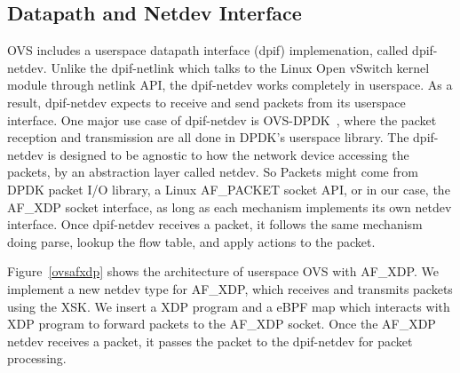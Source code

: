 \documentclass[10pt]{sigplanconf}
\begin{document}
\subsection{Datapath and Netdev Interface}
OVS includes a userspace datapath interface (dpif) implemenation, called dpif-netdev.
Unlike the dpif-netlink which talks to the Linux Open vSwitch kernel
module through netlink API, the dpif-netdev works completely in userspace.
As a result, dpif-netdev expects to receive and send packets from its userspace
interface.  One major use case of dpif-netdev is OVS-DPDK~\cite{ovsdpdk},
where the packet reception and transmission are all done in DPDK's userspace
library. The dpif-netdev is designed to be agnostic to how the network
device accessing the packets, by an abstraction layer called netdev.
So Packets might come from DPDK packet I/O library,
a Linux AF\_PACKET socket API, or in our case, the AF\_XDP socket interface,
as long as each mechanism implements its own netdev interface.
Once dpif-netdev receives a packet, it follows the same mechanism doing
parse, lookup the flow table, and apply actions to the packet.

Figure~\ref{ovsafxdp} shows the architecture of userspace OVS with AF\_XDP.
We implement a new netdev type for AF\_XDP, which receives and transmits
packets using the XSK.  We insert a XDP program and a eBPF map which interacts
with XDP program to forward packets to the AF\_XDP socket.
Once the AF\_XDP netdev receives a packet, it passes the packet to the
dpif-netdev for packet processing.
\end{document}
